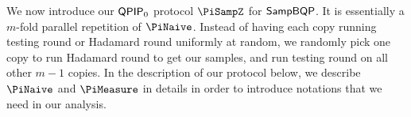 \iffalse
The following protocol is a $\QPIP_0$ protocol for $\SampBQP$

$\forall c\in\bbN$ Soundness = $O(T^{-c})$

Given inverse poly p(T), we can parameterize the protocol to have soundness p(T)
\fi


We now introduce our $\QPIP_0$ protocol $\PiSampZ$ for $\SampBQP$.
It is essentially a $m$-fold parallel repetition of $\PiNaive$.
Instead of having each copy running testing round or Hadamard round uniformly at random, we randomly pick one copy to run Hadamard round to get our samples, and run testing round on all other $m-1$ copies.
In the description of our protocol below, we describe $\PiNaive$ and $\PiMeasure$ in details  in order to introduce notations that we need in our analysis.

